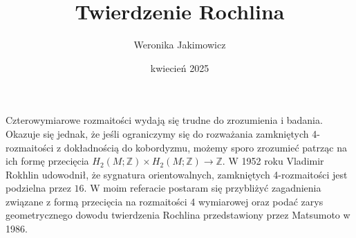 \documentclass{../templatka_abstrakty/knmtabstrakt}
\title{Twierdzenie Rochlina}
\author{Weronika Jakimowicz}
\date{kwiecień 2025}
\begin{document}
\maketitle 

Czterowymiarowe rozmaitości wydają się trudne do zrozumienia i badania. Okazuje się jednak, że jeśli ograniczymy się do rozważania zamkniętych 4-rozmaitości z dokładnością do kobordyzmu, możemy sporo zrozumieć patrząc na ich formę przecięcia $H_2(M;\mathbb{Z})\times H_2(M;\mathbb{Z})\to \mathbb{Z}$. W 1952 roku Vladimir Rokhlin udowodnił, że sygnatura orientowalnych, zamkniętych 4-rozmaitości jest podzielna przez $16$. W moim referacie postaram się przybliżyć zagadnienia związane z formą przecięcia na rozmaitości 4 wymiarowej oraz podać zarys geometrycznego dowodu twierdzenia Rochlina przedstawiony przez Matsumoto w 1986. 
\end{document}
